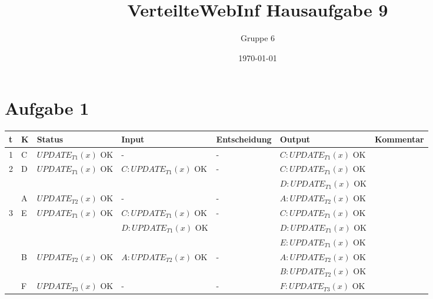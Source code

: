 \documentclass[a4paper, landscape]{article}
\author{Gruppe 6}
\title{\textbf{VerteilteWebInf Hausaufgabe 9}}
\date{\today}
\begin{document}
\maketitle

\section*{Aufgabe 1}



\begin{tabular}{| l | l | l | l | l | l | p{6cm} |}
\hline
t & K & Status & Input & Entscheidung & Output & Kommentar \\
\hline
\hline


1 & C & $UPDATE_{T1}(x)$ OK & - & - & $C: UPDATE_{T1}(x)$ OK & \\
\hline
\hline


2 & \multirow{2}{*}{D} 
			&	$UPDATE_{T1}(x)$ OK 		& $C: UPDATE_{T1}(x)$ OK	& - &	 $C: UPDATE_{T1}(x)$ OK &\\
			& &															& 															   &   &	 $D: UPDATE_{T1}(x)$ OK &\\
\cline{2-7}
   & A & $UPDATE_{T2}(x)$ OK & - & - & $A: UPDATE_{T2}(x)$ OK & \\
\hline
\hline


3 & \multirow{3}{*}{E} 
			&	$UPDATE_{T1}(x)$ OK 		& $C: UPDATE_{T1}(x)$ OK	& - &	 $C: UPDATE_{T1}(x)$ OK &\\
			& &															& $D: UPDATE_{T1}(x)$ OK &   &		 $D: UPDATE_{T1}(x)$ OK &\\
			& &															&																	& 	& 	 $E: UPDATE_{T1}(x)$ OK & \\

\cline{2-7}
& \multirow{2}{*}{B} 
			&	$UPDATE_{T2}(x)$ OK 		& $A: UPDATE_{T2}(x)$ OK	& - &	 $A: UPDATE_{T2}(x)$ OK &\\
			& &															& 															   &   &	 $B: UPDATE_{T2}(x)$ OK &\\
\cline{2-7}
 	& F & $UPDATE_{T3}(x)$ OK & - & - & $F: UPDATE_{T3}(x)$ OK & \\
\hline
\hline



\end{tabular}
\end{document}
